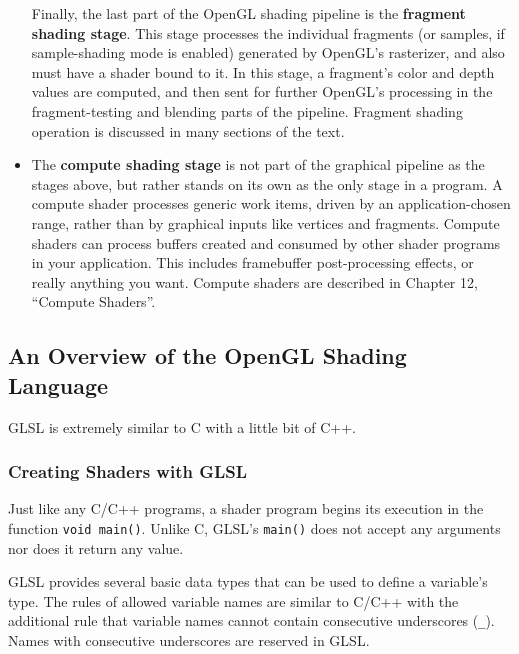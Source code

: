 \documentclass[a4paper, 12pt]{article}
\newcounter{subsubsubsection}[subsubsection]
\begin{document}
\begin{itemize}
            Finally, the last part of the OpenGL shading pipeline is the \textbf{fragment shading stage}.
            This stage processes the individual fragments (or samples, if sample-shading mode is enabled) generated by OpenGL's rasterizer, and also must have a shader bound to it.
            In this stage, a fragment's color and depth values are computed, and then sent for further OpenGL's processing in the fragment-testing and blending parts of the pipeline.
            Fragment shading operation is discussed in many sections of the text.
      \item
            The \textbf{compute shading stage} is not part of the graphical pipeline as the stages above, but rather stands on its own as the only stage in a program.
            A compute shader processes generic work items, driven by an application-chosen range, rather than by graphical inputs like vertices and fragments.
            Compute shaders can process buffers created and consumed by other shader programs in your application.
            This includes framebuffer post-processing effects, or really anything you want.
            Compute shaders are described in Chapter 12, ``Compute Shaders''.

\end{itemize}

\subsection{An Overview of the OpenGL Shading Language}

GLSL is extremely similar to C with a little bit of C++.

\subsubsection{Creating Shaders with GLSL}


Just like any C/C++ programs, a shader program begins its execution in the function \verb|void main()|.
Unlike C, GLSL's \verb|main()| does not accept any arguments nor does it return any value.


GLSL provides several basic data types that can be used to define a variable's type.
The rules of allowed variable names are similar to C/C++ with the additional rule that variable names cannot contain consecutive underscores (\verb|_|).
Names with consecutive underscores are reserved in GLSL.
\end{document}
